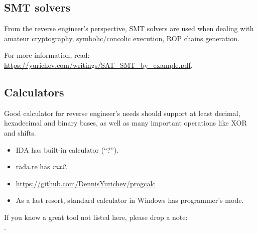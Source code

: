 \subsection{SMT solvers}

From the reverse engineer's perspective, SMT solvers are used when dealing with
amateur cryptography,
symbolic/concolic execution,
ROP chains generation.

For more information, read: \url{https://yurichev.com/writings/SAT_SMT_by_example.pdf}.

\subsection{Calculators}

Good calculator for reverse engineer's needs should support at least decimal, hexadecimal and binary bases,
as well as many important operations like XOR and shifts.

\begin{itemize}

\item IDA has built-in calculator (``?'').

\item rada.re has \emph{rax2}.

\item \url{https://github.com/DennisYurichev/progcalc}

\item As a last resort, standard calculator in Windows has programmer's mode.

\end{itemize}


If you know a great tool not listed here, please drop a note:\\
\TT{\EMAIL}.

